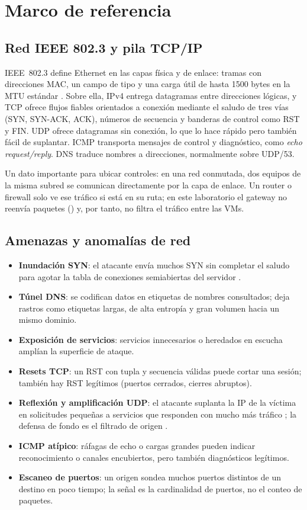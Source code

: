 \chapter{Marco de referencia}\label{cap:marco}

\section{Red IEEE 802.3 y pila TCP/IP}
IEEE~802.3 define Ethernet en las capas física y de enlace: tramas con direcciones MAC, un campo de tipo y una carga útil de hasta 1500 bytes en la MTU estándar \cite{ieee8023}. Sobre ella, IPv4 entrega datagramas entre direcciones lógicas, y TCP \cite{rfc9293} ofrece flujos fiables orientados a conexión mediante el saludo de tres vías (SYN, SYN-ACK, ACK), números de secuencia y banderas de control como RST y FIN. UDP \cite{rfc768} ofrece datagramas sin conexión, lo que lo hace rápido pero también fácil de suplantar. ICMP \cite{rfc792} transporta mensajes de control y diagnóstico, como \emph{echo request/reply}. DNS \cite{rfc1035} traduce nombres a direcciones, normalmente sobre UDP/53.

Un dato importante para ubicar controles: en una red conmutada, dos equipos de la misma subred se comunican directamente por la capa de enlace. Un router o firewall solo ve ese tráfico si está en su ruta; en este laboratorio el gateway no reenvía paquetes () y, por tanto, no filtra el tráfico entre las VMs.

\section{Amenazas y anomalías de red}
\begin{itemize}
\item \textbf{Inundación SYN}: el atacante envía muchos SYN sin completar el saludo para agotar la tabla de conexiones semiabiertas del servidor \cite{rfc4987}.
\item \textbf{Túnel DNS}: se codifican datos en etiquetas de nombres consultados; deja rastros como etiquetas largas, de alta entropía y gran volumen hacia un mismo dominio.
\item \textbf{Exposición de servicios}: servicios innecesarios o heredados en escucha amplían la superficie de ataque.
\item \textbf{Resets TCP}: un RST con tupla y secuencia válidas puede cortar una sesión; también hay RST legítimos (puertos cerrados, cierres abruptos).
\item \textbf{Reflexión y amplificación UDP}: el atacante suplanta la IP de la víctima en solicitudes pequeñas a servicios que responden con mucho más tráfico \cite{rossow2014}; la defensa de fondo es el filtrado de origen \cite{bcp38}.
\item \textbf{ICMP atípico}: ráfagas de echo o cargas grandes pueden indicar reconocimiento o canales encubiertos, pero también diagnósticos legítimos.
\item \textbf{Escaneo de puertos}: un origen sondea muchos puertos distintos de un destino en poco tiempo; la señal es la cardinalidad de puertos, no el conteo de paquetes.
\end{itemize}

